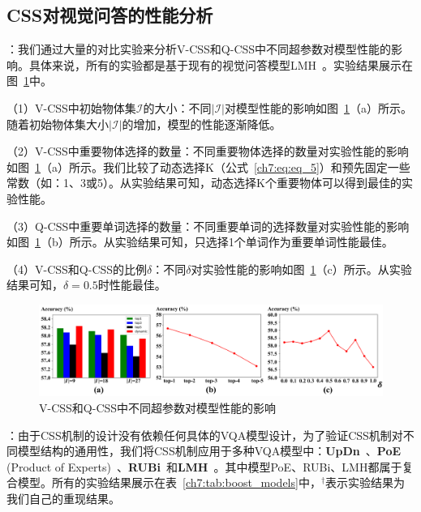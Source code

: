 \subsection{CSS对视觉问答的性能分析}

\textbf{}：我们通过大量的对比实验来分析V-CSS和Q-CSS中不同超参数对模型性能的影响。具体来说，所有的实验都是基于现有的视觉问答模型LMH~\cite{clark2019don}。实验结果展示在图~\ref{ch7:fig:ablative_studies}中。

（1）V-CSS中初始物体集$\mathcal{I}$的大小：不同$|\mathcal{I}|$对模型性能的影响如图~\ref{ch7:fig:ablative_studies}（a）所示。随着初始物体集大小$|\mathcal{I}|$的增加，模型的性能逐渐降低。

（2）V-CSS中重要物体选择的数量：不同重要物体选择的数量对实验性能的影响如图~\ref{ch7:fig:ablative_studies}（a）所示。我们比较了动态选择K（公式~\ref{ch7:eq:eq_5}）和预先固定一些常数（如：1、3或5）。从实验结果可知，动态选择K个重要物体可以得到最佳的实验性能。

（3）Q-CSS中重要单词选择的数量：不同重要单词的选择数量对实验性能的影响如图~\ref{ch7:fig:ablative_studies}（b）所示。从实验结果可知，只选择1个单词作为重要单词性能最佳。

（4）V-CSS和Q-CSS的比例$\delta$：不同$\delta$对实验性能的影响如图~\ref{ch7:fig:ablative_studies}（c）所示。从实验结果可知，$\delta = 0.5$时性能最佳。

\begin{figure}[t]
    \centering
    \includegraphics[width=\linewidth]{chapter7/res/ablative_studies.pdf}
    \caption{V-CSS和Q-CSS中不同超参数对模型性能的影响}
    \label{ch7:fig:ablative_studies}
\end{figure}


\textbf{}：由于CSS机制的设计没有依赖任何具体的VQA模型设计，为了验证CSS机制对不同模型结构的通用性，我们将CSS机制应用于多种VQA模型中：\textbf{UpDn}~\cite{anderson2018bottom}、\textbf{PoE} (Product of Experts)~\cite{clark2019don,mahabadi2019simple}、\textbf{RUBi}~\cite{cadene2019rubi}和\textbf{LMH}~\cite{clark2019don}。其中模型PoE、RUBi、LMH都属于复合模型。所有的实验结果展示在表~\ref{ch7:tab:boost_models}中，$^\dagger$表示实验结果为我们自己的重现结果。

